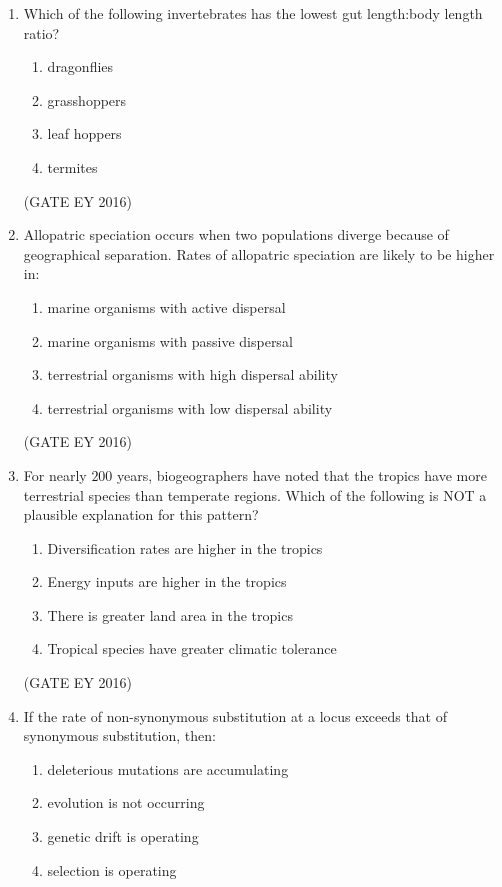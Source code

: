 \documentclass[journal]{IEEEtran}
\begin{document}
\begin{enumerate}
\item Which of the following invertebrates has the lowest gut length:body length ratio?
\begin{multicols}{4}
\begin{enumerate}
    \item dragonflies
    \item grasshoppers
    \item leaf hoppers
    \item termites
\end{enumerate}
\end{multicols}
\hfill{(GATE EY 2016)}

\item Allopatric speciation occurs when two populations diverge because of geographical separation. Rates of allopatric speciation are likely to be higher in:
\begin{enumerate}
    \item marine organisms with active dispersal
    \item marine organisms with passive dispersal
    \item terrestrial organisms with high dispersal ability
    \item terrestrial organisms with low dispersal ability
\end{enumerate}
\hfill{(GATE EY 2016)}

\item For nearly $200$ years, biogeographers have noted that the tropics have more terrestrial species than temperate regions. Which of the following is NOT a plausible explanation for this pattern?
\begin{enumerate}
    \item Diversification rates are higher in the tropics
    \item Energy inputs are higher in the tropics
    \item There is greater land area in the tropics
    \item Tropical species have greater climatic tolerance
\end{enumerate}
\hfill{(GATE EY 2016)}

\item If the rate of non-synonymous substitution at a locus exceeds that of synonymous substitution, then:
\begin{enumerate}
    \item deleterious mutations are accumulating
    \item evolution is not occurring
    \item genetic drift is operating
    \item selection is operating
\end{enumerate}


\end{enumerate}
\end{document}
